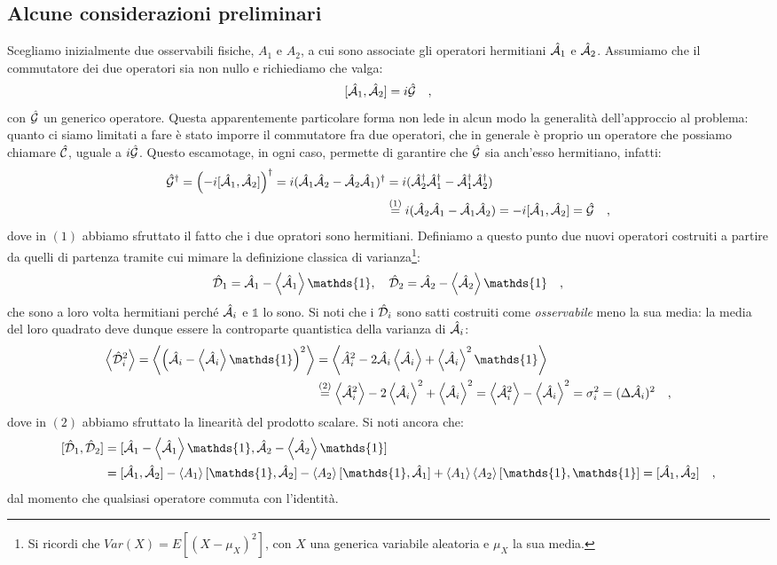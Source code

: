 \subsection{Alcune considerazioni preliminari}
Scegliamo inizialmente due osservabili fisiche, $A_1$ e $A_2$, a cui sono associate gli operatori hermitiani $\h{A}_1$ e $\h{A}_2$. Assumiamo che il commutatore dei due operatori sia non nullo e richiediamo che valga:
\[
    [\h{A}_1, \h{A}_2] = i\h{G} \quad,
\]
con $\h{G}$ un generico operatore. Questa apparentemente particolare forma non lede in alcun modo la generalità dell'approccio al problema: quanto ci siamo limitati a fare è stato imporre il commutatore fra due operatori, che in generale è proprio un operatore che possiamo chiamare $\h{C}$, uguale a $i\h{G}$. Questo escamotage, in ogni caso, permette di garantire che $\h{G}$ sia anch'esso hermitiano, infatti:
\[
\begin{aligned}
    \hd{G} = \left(-i[\h{A}_1, \h{A}_2]\right)^\dagger = i(\h{A}_1\h{A}_2 - \h{A}_2\h{A}_1)^\dagger &= i(\hd{A}_2\hd{A}_1 - \hd{A}_1\hd{A}_2) \\ &\giustifica[=]{1} i(\h{A}_2\h{A}_1 - \h{A}_1\h{A}_2) = -i[\h{A}_1, \h{A}_2] = \h{G} \quad,
\end{aligned}
\]
dove in $(1)$ abbiamo sfruttato il fatto che i due opratori sono hermitiani. Definiamo a questo punto due nuovi operatori costruiti a partire da quelli di partenza tramite cui mimare la definizione classica di varianza\footnote{Si ricordi che $Var(X) = E[(X-\mu_X)^2]$, con $X$ una generica variabile aleatoria e $\mu_X$ la sua media.}:
\[
    \h{D}_1 = \h{A}_1 - \avg{\h{A}_1}\mathds{1}, \quad \h{D}_2 = \h{A}_2 - \avg{\h{A}_2}\mathds{1} \quad,
\]
che sono a loro volta hermitiani perché $\h{A}_i$ e $\mathds{1}$ lo sono. Si noti che i $\h{D}_i$ sono satti costruiti come \emph{osservabile} meno la sua media: la media del loro quadrato deve dunque essere la controparte quantistica della varianza di $\h{A}_i$:
\begin{equation}
\begin{aligned}
        \avg{\h{D}_i^2} = \avg{\left( \h{A}_i - \avg{\h{A}_i} \mathds{1} \right)^2} &= \avg{\hat{A}_i^2 - 2\h{A}_i\avg{\h{A}_i} + \avg{\h{A}_i}^2 \mathds{1}} \\ &\giustifica[=]{2} \avg{\h{A}_i^2} - 2\avg{\h{A}_i}^2 + \avg{\h{A}_i}^2 = \avg{\h{A}_i^2} - \avg{\h{A}_i}^2 = \sigma_i^2 = (\Delta \h{A}_i)^2 \quad,
\end{aligned}
\label{eq:varianza_A}
\end{equation}
dove in $(2)$ abbiamo sfruttato la linearità del prodotto scalare. Si noti ancora che:
\[
\begin{aligned}
    [\h{D}_1, \h{D}_2] &= [\h{A}_1 - \avg{\h{A}_1}\mathds{1}, \h{A}_2 - \avg{\h{A}_2}\mathds{1}] \\ &= [\h{A}_1, \h{A}_2] - \avg{A_1}[\mathds{1}, \h{A}_2] - \avg{A_2}[\mathds{1}, \h{A}_1] + \avg{A_1}\avg{A_2}[\mathds{1}, \mathds{1}] = [\h{A}_1, \h{A}_2] \quad,
\end{aligned}
\]
dal momento che qualsiasi operatore commuta con l'identità. 

